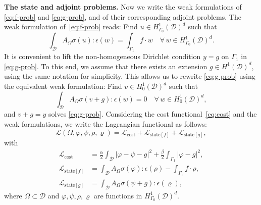 \documentclass[iicol,pdflatex,sn-mathphys-ay]{sn-jnl}%
\theoremstyle{thmstyleone}%
\theoremstyle{thmstyletwo}%
\theoremstyle{thmstylethree}%
\begin{document}
\textbf{The state and adjoint problems.}
Now we write the weak formulations of \eqref{eq:f-prob} and \eqref{eq:g-prob},
and of their corresponding adjoint problems.
The weak formulation of~\eqref{eq:f-prob} reads:
Find $u \in  H^1_{\Gamma_0}(\mathcal{D})^d$ such that
\begin{equation} \label{eq:w-f}
	\int_{\mathcal{D}} A_{\Omega}\sigma(u):\epsilon(w) =
	\int_{\Gamma_1} f \cdot w
	\quad
	\forall \, w \in  H^1_{\Gamma_0}(\mathcal{D})^d.
\end{equation}
It is convenient to lift the non-homogeneous Dirichlet condition $y=g$ on $\Gamma_1$ in \eqref{eq:g-prob}.
To this end, we assume that there exists an extension $g\in H^1(\mathcal{D})^d$, using the same notation for simplicity.
This allows us to rewrite \eqref{eq:g-prob} using the equivalent weak formulation:
Find $v \in  H^1_{0}(\mathcal{D})^d$ such that
\begin{equation} \label{eq:w-g}
	\int_{\mathcal{D}} A_{\Omega}\sigma(v + g):\epsilon(w) = 0
	\quad
	\forall \, w \in  H^1_{0}(\mathcal{D})^d,
\end{equation}
and ${v + g} =y$ solves \eqref{eq:g-prob}.
Considering the cost functional~\eqref{eq:cost}
and the weak formulations, we write
the Lagrangian functional
as follows:
\begin{equation} \label{eq:elastic_lag}
	\mathcal{L}(\Omega, \varphi, \psi, \rho, \varrho) =
	\mathcal{L}_{\mathrm{cost}} +
	\mathcal{L}_{\mathrm{state}[f]} +
	\mathcal{L}_{\mathrm{state}[g]},
\end{equation}
with
\begin{align*}
	\mathcal{L}_{\mathrm{cost}}    &= \frac{\alpha}{2}\int_{\mathcal{D}} \left|\varphi-\psi - g\right|^{2} + \frac{\beta}{2}\int_{\Gamma_{1}} \left|\varphi - g \right|^{2}, \\
	\mathcal{L}_{\mathrm{state}[f]}   &= \int_{\mathcal{D}} A_{\Omega} \sigma(\varphi) : \epsilon(\rho) - \int_{\Gamma_{1}} f \cdot \rho, \\
	\mathcal{L}_{\mathrm{state}[g]} &= \int_{\mathcal{D}} A_{\Omega} \sigma(\psi + g) : \epsilon(\varrho),
\end{align*}
where $\Omega\subset\mathcal{D}$ and $\varphi, \psi, \rho, \varrho$ are functions in $H^1_{\Gamma_0}(\mathcal{D})^d$.
\end{document}
